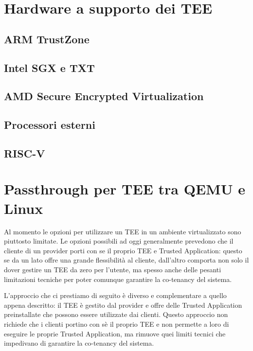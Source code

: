\documentclass[12pt,italian]{report}
\begin{document}
\chapter{Hardware a supporto dei TEE}
\label{chap:hardware-supporto-tee}

\section{ARM TrustZone}
\label{sec:arm-trustzone}

\section{Intel SGX e TXT}
\label{sec:intel-sgx-txt}

\section{AMD Secure Encrypted Virtualization}
\label{sec:amd-sev}

\section{Processori esterni}
\label{sec:processori-esterni}

\section{RISC-V}
\label{sec:risc-v}

\chapter{Passthrough per TEE tra QEMU e Linux}
\label{chap:passthrough-tee-qemu-linux}
Al momento le opzioni per utilizzare un TEE in un ambiente virtualizzato
sono piuttosto limitate.
Le opzioni possibili ad oggi generalmente prevedono che il cliente di un
provider porti con se il proprio TEE e Trusted Application:
questo se da un lato offre una grande flessibilità al cliente, dall'altro
comporta non solo il dover gestire un TEE da zero per l'utente, ma spesso
anche delle pesanti limitazioni tecniche per poter comunque garantire la
co-tenancy del sistema.

L'approccio che ci prestiamo di seguito è diverso e complementare a quello
appena descritto: il TEE è gestito dal provider e offre delle Trusted
Application preinstallate che possono essere utilizzate dai clienti.
Questo approccio non richiede che i clienti portino con sè il proprio TEE
e non permette a loro di eseguire le proprie Trusted Application, ma rimuove
quei limiti tecnici che impedivano di garantire la co-tenancy del sistema.
\end{document}
